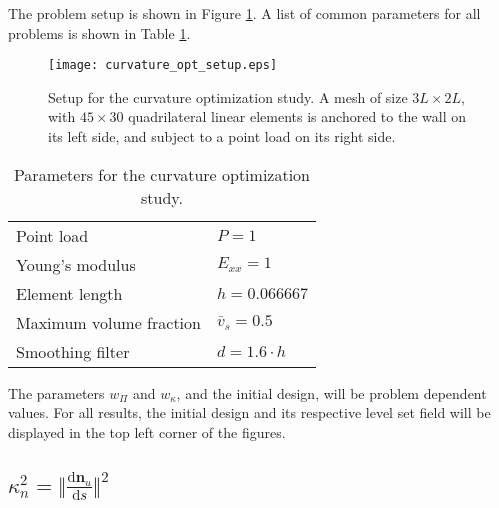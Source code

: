 The problem setup is shown in Figure \ref{fig:curvature_opt_setup}. A list of common parameters for all problems is shown in Table \ref{tab:curvature_opt_parameters}.
%
\begin{figure}
	\centering
	\texttt{[image: curvature\_opt\_setup.eps]}
	\caption{Setup for the curvature optimization study. A mesh of size $3L \times 2L$, with $45 \times 30$ quadrilateral linear elements is anchored to the wall on its left side, and subject to a point load on its right side.}
	\label{fig:curvature_opt_setup}
\end{figure}
%
\begin{table}
	\centering
	\begin{tabular*}{0.75\textwidth}{l l}
	\hline
	Point load                  & $P = 1$ \\
	Young's modulus             & $E_{xx} = 1$ \\
    Element length              & $h=0.066667$ \\
    Maximum volume fraction     & $\bar{v}_{s} = 0.5$ \\
	Smoothing filter            & $d = 1.6 \cdot h$ \\
	\hline
	\end{tabular*}
	\caption{Parameters for the curvature optimization study.}
	\label{tab:curvature_opt_parameters}
\end{table}
%
The parameters $w_{\Pi}$ and $w_{\kappa}$, and the initial design, will be problem dependent values. For all results, the initial design and its respective level set field will be displayed in the top left corner of the figures.


\subsection{$\kappa_{n}^2 = \Vert \frac{\mathrm{d}\mathbf{n}_{u}}{\mathrm{d}s}\Vert^2$}

